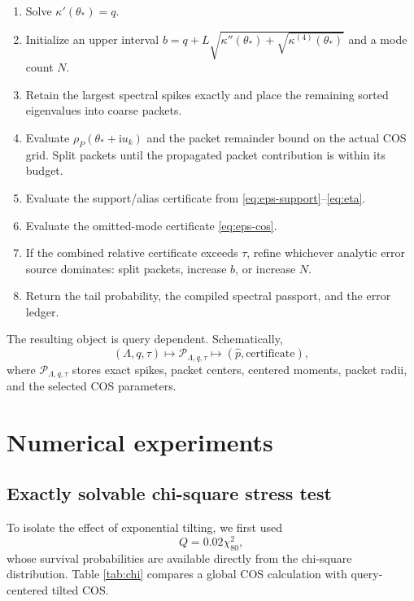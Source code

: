 \documentclass[11pt]{article}
\theoremstyle{definition}
\newcommand{\ii}{\mathrm{i}}
\begin{document}
\begin{enumerate}[leftmargin=2em]
\item Solve $\kappa'(\theta_*)=q$.
\item Initialize an upper interval $b=q+L\sqrt{\kappa''(\theta_*)+\sqrt{\kappa^{(4)}(\theta_*)}}$ and a mode count $N$.
\item Retain the largest spectral spikes exactly and place the remaining sorted eigenvalues into coarse packets.
\item Evaluate $\rho_P(\theta_*+\ii u_k)$ and the packet remainder bound on the actual COS grid. Split packets until the propagated packet contribution is within its budget.
\item Evaluate the support/alias certificate from \eqref{eq:eps-support}--\eqref{eq:eta}.
\item Evaluate the omitted-mode certificate \eqref{eq:eps-cos}.
\item If the combined relative certificate exceeds $\tau$, refine whichever analytic error source dominates: split packets, increase $b$, or increase $N$.
\item Return the tail probability, the compiled spectral passport, and the error ledger.
\end{enumerate}

The resulting object is query dependent. Schematically,
\begin{equation}
(\Lambda,q,\tau)
\longmapsto
\mathcal P_{\Lambda,q,\tau}
\longmapsto
(\widehat p,\text{certificate}),
\label{eq:compiler-map}
\end{equation}
where $\mathcal P_{\Lambda,q,\tau}$ stores exact spikes, packet centers, centered moments, packet radii, and the selected COS parameters.

\section{Numerical experiments}

\subsection{Exactly solvable chi-square stress test}

To isolate the effect of exponential tilting, we first used
\[
Q=0.02\chi^2_{80},
\]
whose survival probabilities are available directly from the chi-square distribution. Table \ref{tab:chi} compares a global COS calculation with query-centered tilted COS.
\end{document}
